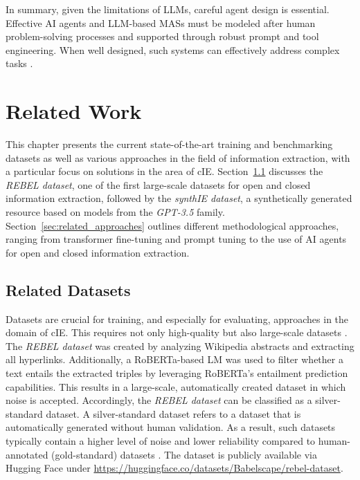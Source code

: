 \documentclass[a4paper,oneside,bibliography=totoc]{scrbook}
\begin{document}
In summary, given the limitations of \acp{LLM}, careful agent design is essential. Effective \ac{AI} agents and \ac{LLM}-based \acp{MAS} must be modeled after human problem-solving processes and supported through robust prompt and tool engineering. When well designed, such systems can effectively address complex tasks \cite{Hadfield2025}.

\chapter{Related Work}
\label{ch:related_work_chapter}

This chapter presents the current state-of-the-art training and benchmarking datasets as well as various approaches in the field of information extraction, with a particular focus on solutions in the area of \ac{cIE}. Section~\ref{sec:related_datasets} discusses the \textit{REBEL dataset}, one of the first large-scale datasets for open and closed information extraction, followed by the \textit{synthIE dataset}, a synthetically generated resource based on models from the \textit{GPT-3.5} family. Section~\ref{sec:related_approaches} outlines different methodological approaches, ranging from transformer fine-tuning and prompt tuning to the use of \ac{AI} agents for open and closed information extraction.

\section{Related Datasets}
\label{sec:related_datasets}

Datasets are crucial for training, and especially for evaluating, approaches in the domain of \ac{cIE}. This requires not only high-quality but also large-scale datasets \cite{Josifoski2023}. The \textit{REBEL dataset} was created by analyzing Wikipedia abstracts and extracting all hyperlinks. Additionally, a RoBERTa-based \ac{LM} was used to filter whether a text entails the extracted triples by leveraging RoBERTa’s entailment prediction capabilities. This results in a large-scale, automatically created dataset in which noise is accepted. Accordingly, the \textit{REBEL dataset} can be classified as a silver-standard dataset. A silver-standard dataset refers to a dataset that is automatically generated without human validation. As a result, such datasets typically contain a higher level of noise and lower reliability compared to human-annotated (gold-standard) datasets \cite{HuguetCabot2021}. The dataset is publicly available via Hugging Face under \url{https://huggingface.co/datasets/Babelscape/rebel-dataset}.
\end{document}
